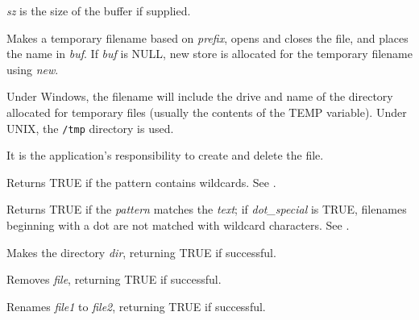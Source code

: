{\it sz} is the size of the buffer if supplied.



Makes a temporary filename based on {\it prefix}, opens and closes the file,
and places the name in {\it buf}. If {\it buf} is NULL, new store
is allocated for the temporary filename using {\it new}.

Under Windows, the filename will include the drive and name of the
directory allocated for temporary files (usually the contents of the
TEMP variable). Under UNIX, the {\tt /tmp} directory is used.

It is the application's responsibility to create and delete the file.

\label{wxiswild}


Returns TRUE if the pattern contains wildcards. See .

\label{wxmatchwild}


Returns TRUE if the {\it pattern}\/ matches the {\it text}\/; if {\it
dot\_special}\/ is TRUE, filenames beginning with a dot are not matched
with wildcard characters. See .



Makes the directory {\it dir}, returning TRUE if successful.



Removes {\it file}, returning TRUE if successful.



Renames {\it file1} to {\it file2}, returning TRUE if successful.



